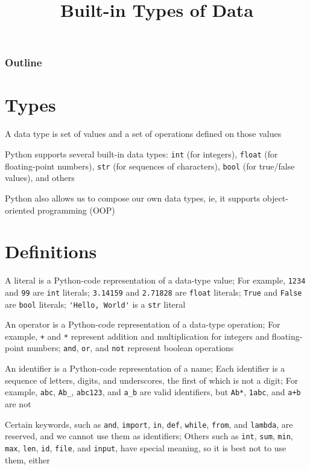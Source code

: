 \documentclass[8pt,a4paper,compress]{beamer}
\title{Built-in Types of Data}
\date{}
\begin{document}
\begin{frame}
\vfill
\titlepage
\end{frame}

\begin{frame}
\frametitle{Outline}
\tableofcontents
\end{frame}

\section{Types}
\begin{frame}[fragile]
\pause

A data type is set of values and a set of operations defined on those values

\pause
\bigskip

Python supports several built-in data types: \lstinline{int} (for integers), \lstinline{float} (for floating-point numbers), \lstinline{str} (for sequences of characters), \lstinline{bool} (for true/false values), and others

\pause
\bigskip

Python also allows us to compose our own data types, ie, it supports object-oriented programming (OOP)
\end{frame}

\section{Definitions}
\begin{frame}[fragile]
\pause

A literal is a Python-code representation of a data-type value;  For example, \lstinline{1234} and \lstinline{99} are \lstinline{int} literals; \lstinline{3.14159} and \lstinline{2.71828} are \lstinline{float} literals; \lstinline{True} and \lstinline{False} are \lstinline{bool} literals; \lstinline{'Hello, World'} is a \lstinline{str} literal

\pause
\bigskip

An operator is a Python-code representation of a data-type operation; For example, \lstinline{+} and \lstinline{*} represent addition and multiplication for integers and floating-point numbers; \lstinline{and}, \lstinline{or}, and \lstinline{not} represent boolean operations

\pause
\bigskip

An identifier is a Python-code representation of a name; Each identifier is a sequence of letters, digits, and underscores, the first of which is not a digit; For example, \lstinline{abc}, \lstinline{Ab_}, \lstinline{abc123}, and \lstinline{a_b} are valid identifiers, but \lstinline{Ab*}, \lstinline{1abc}, and \lstinline{a+b} are not

\pause
\bigskip

Certain keywords, such as \lstinline{and}, \lstinline{import}, \lstinline{in}, \lstinline{def}, \lstinline{while}, \lstinline{from}, and \lstinline{lambda}, are reserved, and we cannot use them as identifiers; Others such as \lstinline{int}, \lstinline{sum}, \lstinline{min}, \lstinline{max}, \lstinline{len}, \lstinline{id}, \lstinline{file}, and \lstinline{input}, have special meaning, so it is best not to use them, either
\end{frame}
\end{document}
